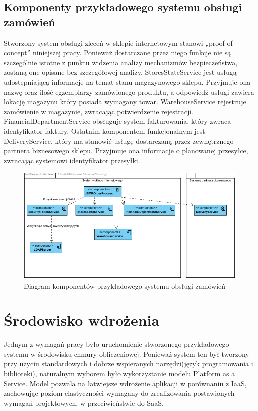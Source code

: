 	\subsection{Komponenty przykładowego systemu obsługi zamówień}	
		
		Stworzony system obsługi zleceń w sklepie internetowym stanowi „proof of concept” niniejszej pracy. Ponieważ dostarczane przez niego funkcje nie są szczególnie istotne z punktu widzenia analizy mechanizmów bezpieczeństwa, zostaną one opisane bez szczegółowej analizy. StoresStateService jest usługą udostępniającą informacje na temat stanu magazynowego sklepu. Przyjmuje ona nazwę oraz ilość egzemplarzy zamówionego produktu, a odpowiedź usługi zawiera lokację magazynu który posiada wymagany towar. WarehouseService rejestruje zamówienie w magazynie, zwracając potwierdzenie rejestracji. FinancialDepartmentService obsługuje system fakturowania, który zwraca identyfikator faktury. Ostatnim komponentem funkcjonalnym jest DeliveryService, który ma stanowić usługę dostarczaną przez zewnętrznego partnera biznesowego sklepu. Przyjmuje ona informacje o planowanej przesyłce, zwracając systemowi identyfikator przesyłki. 
		
		\begin{figure}[h]
			\centering
			\includegraphics{img/KomponentySystemu.png}
			\caption{Diagram komponentów przykładowego systemu obsługi zamówień}
			\label{Komponenty}
		\end{figure}	
		

\section{Środowisko wdrożenia}
\label{sec:srodowiskoWdrozenia}

Jednym z wymagań pracy było uruchomienie stworzonego przykładowego systemu w środowisku chmury obliczeniowej. Ponieważ system ten był tworzony przy użyciu standardowych i dobrze wspieranych narzędzi(język programowania i biblioteki), naturalnym wyborem było wykorzystanie modelu Platform as a Service. Model pozwala na łatwiejsze wdrożenie aplikacji w porównaniu z IaaS, zachowując poziom elastyczności wymagany do zrealizowania postawionych wymagań projektowych, w przeciwieństwie do SaaS.

